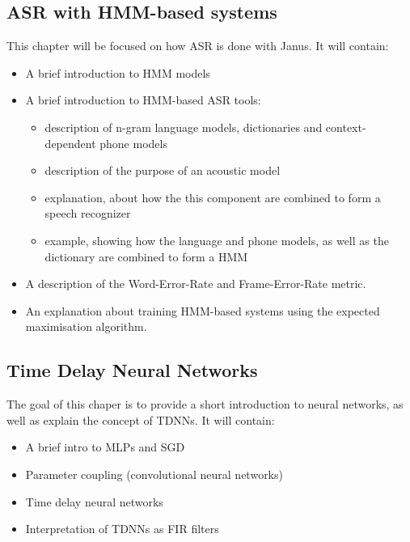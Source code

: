 \subsection{}



\label{ch:realted_work}
\subsection{ASR with HMM-based systems}
\label{ch:HMM_ASR}

This chapter will be focused on how ASR is done with Janus. It will contain: 
\begin{itemize}
	\item A brief introduction to HMM models
	\item A brief introduction to HMM-based ASR tools:
	\begin{itemize}
		\item description of n-gram language models, dictionaries and context-dependent phone models
		\item description of the purpose of an acoustic model
		\item explanation, about how the this component are combined to form a speech recognizer 
		\item example, showing how the language and phone models, as well as the dictionary are combined to form a HMM
	\end{itemize}
	\item A description of the Word-Error-Rate and Frame-Error-Rate metric. 
	\item An explanation about training HMM-based systems using the expected maximisation algorithm. 
\end{itemize}

\subsection{Time Delay Neural Networks}
\label{ch:TDNN}
The goal of this chaper is to provide a short introduction to neural networks, 
as well as explain the concept of TDNNs. It will contain:
\begin{itemize}
	\item A brief intro to MLPs and SGD
	\item Parameter coupling (convolutional neural networks)
	\item Time delay neural networks
	\item Interpretation of TDNNs as FIR filters
\end{itemize}

